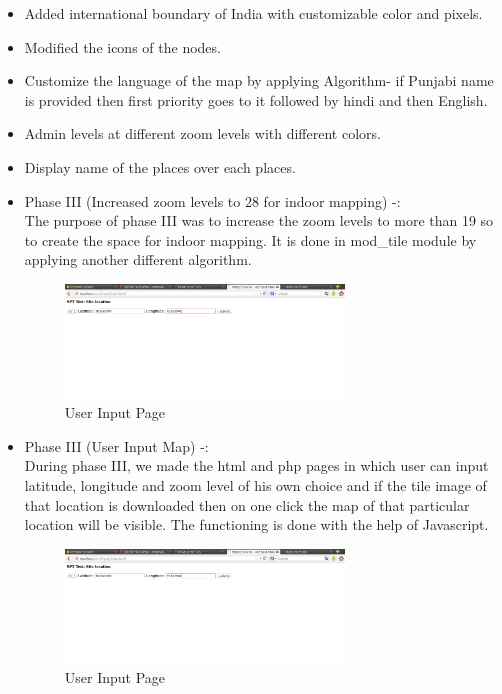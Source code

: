\begin{itemize}
\begin{itemize}
\item Added international boundary of India with customizable color and pixels.
\item Modified the icons of the nodes.
\item Customize the language of the map by applying Algorithm- if Punjabi name is provided then first priority goes to it followed by hindi and then English.
\item Admin levels at different zoom levels with different colors.	
\item Display name of the places over each places.

\item Phase III (Increased zoom levels to 28 for indoor mapping) -: \\
	        The purpose of phase III was to increase the zoom levels to more than 19 so to create the space for indoor mapping. It is done in mod\_tile module by applying another different algorithm. 
		\begin{figure}[ht]
			\centering \includegraphics[width=0.7\textwidth]{input/images/osm2.png}
			\caption{User Input Page}
		\end{figure}

\item Phase III (User Input Map) -: \\
        During phase III, we made the html and php pages in which user can input latitude, longitude and zoom level of his own choice and if the tile image of that location is downloaded then on one click the map of that particular location will be visible. The functioning is done with the help of Javascript.
\begin{figure}[ht]
\centering \includegraphics[width=0.7\textwidth]{input/images/osm2.png}
\caption{User Input Page}
\end{figure}


\end{itemize}
\end{itemize}
